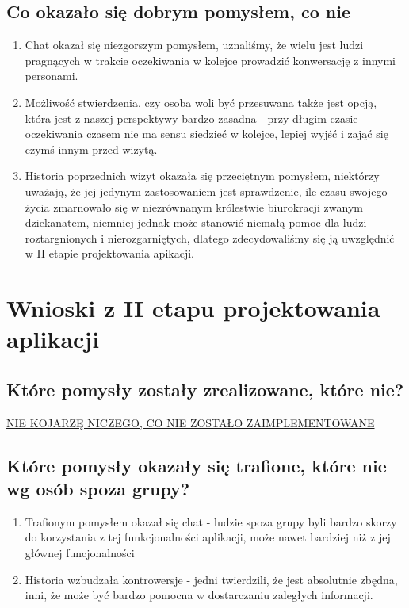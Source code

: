 \documentclass[12pt]{article}
\begin{document}
\subsection{Co okazało się dobrym pomysłem, co nie}
\begin {enumerate}
	\item Chat okazał się niezgorszym pomysłem, uznaliśmy, że wielu jest ludzi pragnących w trakcie oczekiwania w kolejce prowadzić konwersację z innymi personami. 
	
	\item Możliwość stwierdzenia, czy osoba woli być przesuwana także jest opcją, która jest z naszej perspektywy bardzo zasadna - przy długim czasie oczekiwania czasem nie ma sensu siedzieć w kolejce, lepiej wyjść i zająć się czymś innym przed wizytą.
	
	\item Historia poprzednich wizyt okazała się przeciętnym pomysłem, niektórzy uważają, że jej jedynym zastosowaniem jest sprawdzenie, ile czasu swojego życia zmarnowało się w niezrównanym królestwie biurokracji zwanym dziekanatem, niemniej jednak może stanowić niemałą pomoc dla ludzi roztargnionych i nierozgarniętych, dlatego zdecydowaliśmy się ją uwzględnić w II etapie projektowania apikacji.
	
\end {enumerate}

\section {Wnioski z II etapu projektowania aplikacji}
\subsection {Które pomysły zostały zrealizowane, które nie?}
\underline{NIE KOJARZĘ NICZEGO, CO NIE ZOSTAŁO ZAIMPLEMENTOWANE}
\subsection{Które pomysły okazały się trafione, które nie wg osób spoza grupy?}
\begin{enumerate}
	\item Trafionym pomysłem okazał się chat - ludzie spoza grupy byli bardzo skorzy do korzystania z tej funkcjonalności aplikacji, może nawet bardziej niż z jej głównej funcjonalności
	\item Historia wzbudzała kontrowersje - jedni twierdzili, że jest absolutnie zbędna, inni, że może być bardzo pomocna w dostarczaniu zaległych informacji.
\end{enumerate}
\end{document}
